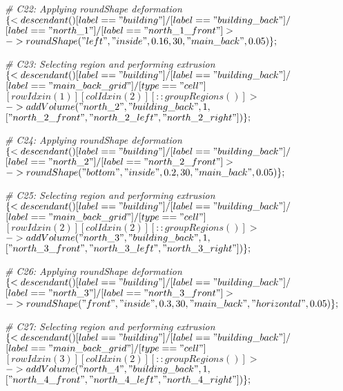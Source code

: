 \noindent \textit{\# C22: Applying roundShape deformation}\\
$\{< descendant() [label=="building"] / [label=="building\_back"] / $\\
$[label=="north\_1"] / [label=="north\_1\_front"] > $\\
$-> roundShape("left", "inside", 0.16, 30, "main\_back", 0.05)\};$

\noindent \textit{\# C23: Selecting region and performing extrusion}\\
$\{< descendant() [label=="building"] / [label=="building\_back"] / $\\
$[label=="main\_back\_grid"] / [type=="cell"] $\\
$[rowIdx in (1)] [colIdx in (2)] [::groupRegions()] > $\\
$-> addVolume("north\_2", "building\_back", 1, $\\
$["north\_2\_front", "north\_2\_left", "north\_2\_right"])\};$

\noindent \textit{\# C24: Applying roundShape deformation}\\
$\{< descendant() [label=="building"] / [label=="building\_back"] / $\\
$[label=="north\_2"] / [label=="north\_2\_front"] > $\\
$-> roundShape("bottom", "inside", 0.2, 30, "main\_back", 0.05)\};$

\noindent \textit{\# C25: Selecting region and performing extrusion}\\
$\{< descendant() [label=="building"] / [label=="building\_back"] / $\\
$[label=="main\_back\_grid"] / [type=="cell"] $\\
$[rowIdx in (2)] [colIdx in (2)] [::groupRegions()] > $\\
$-> addVolume("north\_3", "building\_back", 1, $\\
$["north\_3\_front", "north\_3\_left", "north\_3\_right"])\};$

\noindent \textit{\# C26: Applying roundShape deformation}\\
$\{< descendant() [label=="building"] / [label=="building\_back"] / $\\
$[label=="north\_3"] / [label=="north\_3\_front"] > $\\
$-> roundShape("front", "inside", 0.3, 30, "main\_back", "horizontal", 0.05)\};$

\noindent \textit{\# C27: Selecting region and performing extrusion}\\
$\{< descendant() [label=="building"] / [label=="building\_back"] / $\\
$[label=="main\_back\_grid"] / [type=="cell"] $\\
$[rowIdx in (3)] [colIdx in (2)] [::groupRegions()] > $\\
$-> addVolume("north\_4", "building\_back", 1, $\\
$["north\_4\_front", "north\_4\_left", "north\_4\_right"])\};$

